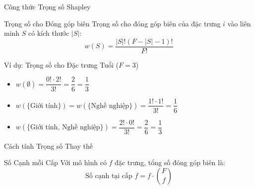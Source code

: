 \documentclass[notheorems, aspectratio=149]{beamer}
\begin{document}
\begin{frame}{Công thức Trọng số Shapley}
\begin{block}{Trọng số cho Đóng góp biên}
Trọng số cho đóng góp biên của đặc trưng $i$ vào liên minh $S$ có kích thước $|S|$:
\begin{equation}
w(S) = \dfrac{|S|!(F-|S|-1)!}{F!}
\end{equation}
\end{block}

\begin{exampleblock}{Ví dụ: Trọng số cho Đặc trưng Tuổi ($F=3$)}
\begin{itemize}
    \item $w(\emptyset) = \dfrac{0! \cdot 2!}{3!} = \dfrac{2}{6} = \dfrac{1}{3}$
    \item $w(\{\text{Giới tính}\}) = w(\{\text{Nghề nghiệp}\}) = \dfrac{1! \cdot 1!}{3!} = \dfrac{1}{6}$
    \item $w(\{\text{Giới tính, Nghề nghiệp}\}) = \dfrac{2! \cdot 0!}{3!} = \dfrac{2}{6} = \dfrac{1}{3}$
\end{itemize}
\end{exampleblock}
\end{frame}

\begin{frame}{Cách tính Trọng số Thay thế}
\begin{block}{Số Cạnh mỗi Cấp}
Với mô hình có $f$ đặc trưng, tổng số đóng góp biên là:
\begin{equation}
\text{Số cạnh tại cấp } f = f \cdot \binom{F}{f}
\end{equation}
\end{block}
\end{frame}
\end{document}
